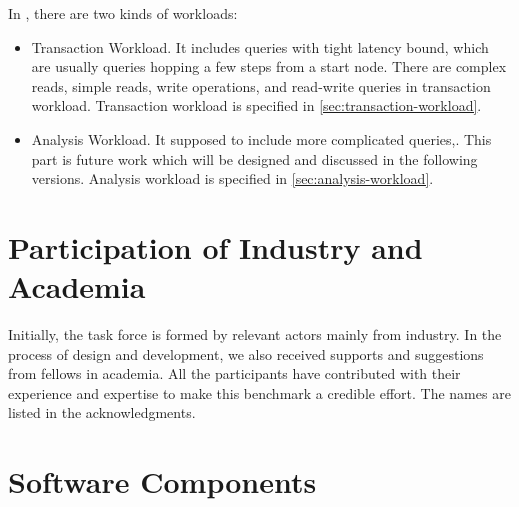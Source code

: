 In \ldbcfinbench, there are two kinds of workloads:
\begin{itemize}
    \item Transaction Workload. It includes queries with tight latency bound, which are usually
          queries hopping a few steps from a start node. There are complex reads, simple reads, write
          operations, and read-write queries in transaction workload. Transaction workload is specified
          in \autoref{sec:transaction-workload}.
    \item Analysis Workload. It supposed to include more complicated queries,. This part is future work which will be designed and discussed in the
          following versions. Analysis workload is specified in \autoref{sec:analysis-workload}.
\end{itemize}


\section{Participation of Industry and Academia}

Initially, the \ldbcfinbench task force is formed by relevant actors mainly from
industry. In the process of design and development, we also received supports and
suggestions from fellows in academia. All the participants have contributed with
their experience and expertise to make this benchmark a credible effort. The names
are listed in the acknowledgments.


\section{Software Components}

